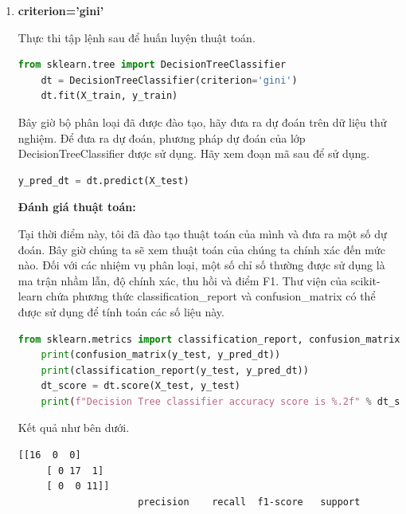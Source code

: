 \begin{enumerate}[label=(\alph*)]
    \item \textbf{criterion='gini'}

    Thực thi tập lệnh sau để huấn luyện thuật toán.

    \begin{center}
    \begin{lstlisting}[language=Python,breaklines=true]
    from sklearn.tree import DecisionTreeClassifier
    dt = DecisionTreeClassifier(criterion='gini')
    dt.fit(X_train, y_train)
    \end{lstlisting}
    \end{center}

    Bây giờ bộ phân loại đã được đào tạo, hãy đưa ra dự đoán
    trên dữ liệu thử nghiệm.
    Để đưa ra dự đoán, phương pháp dự đoán của lớp DecisionTreeClassifier
    được sử dụng. Hãy xem đoạn mã sau để sử dụng.

    \begin{center}
    \begin{lstlisting}[language=Python,breaklines=true]
    y_pred_dt = dt.predict(X_test)
    \end{lstlisting}
    \end{center}

    \textbf{Đánh giá thuật toán:}

    Tại thời điểm này, tôi đã đào tạo thuật toán của mình và
    đưa ra một số dự đoán. Bây giờ chúng ta sẽ xem thuật toán
    của chúng ta chính xác đến mức nào.
    Đối với các nhiệm vụ phân loại, một số chỉ số thường được sử dụng
    là ma trận nhầm lẫn, độ chính xác, thu hồi và điểm F1.
    Thư viện của scikit-learn chứa phương thức classification\_report và
    confusion\_matrix có thể được sử dụng để tính toán các số liệu này.

    \begin{center}
    \begin{lstlisting}[language=Python,breaklines=true]
    from sklearn.metrics import classification_report, confusion_matrix
    print(confusion_matrix(y_test, y_pred_dt))
    print(classification_report(y_test, y_pred_dt))
    dt_score = dt.score(X_test, y_test)
    print(f"Decision Tree classifier accuracy score is %.2f" % dt_score)
    \end{lstlisting}
    \end{center}

    Kết quả như bên dưới.

    \begin{center}
    \begin{lstlisting}[basicstyle=\fontsize{11}{13}\selectfont\ttfamily]
    [[16  0  0]
     [ 0 17  1]
     [ 0  0 11]]
                     precision    recall  f1-score   support


\end{lstlisting}
\end{center}
\end{enumerate}
